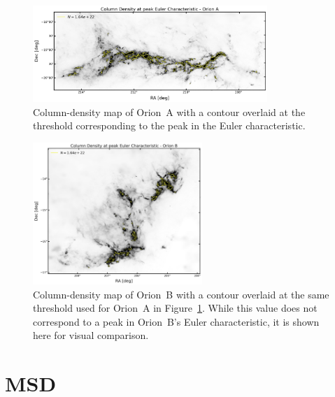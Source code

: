 \begin{figure}[h]
    \centering
    \includegraphics[width=0.79\textwidth]{figures/Euler_Orion_A_gallery.png}
    \caption{Column-density map of Orion~A with a contour overlaid at the threshold corresponding to the peak in the Euler characteristic.}
    \label{fig:gallery_euler_OA}
\end{figure}

\begin{figure}[h]
    \centering
    \includegraphics[width=0.57\textwidth]{figures/Euler_Orion_B_gallery.png}
    \caption{Column-density map of Orion~B with a contour overlaid at the same threshold used for Orion~A in Figure~\ref{fig:gallery_euler_OA}. While this value does not correspond to a peak in Orion~B’s Euler characteristic, it is shown here for visual comparison.}
    \label{fig:gallery_euler_OB}
\end{figure}



\clearpage

\section{MSD}

